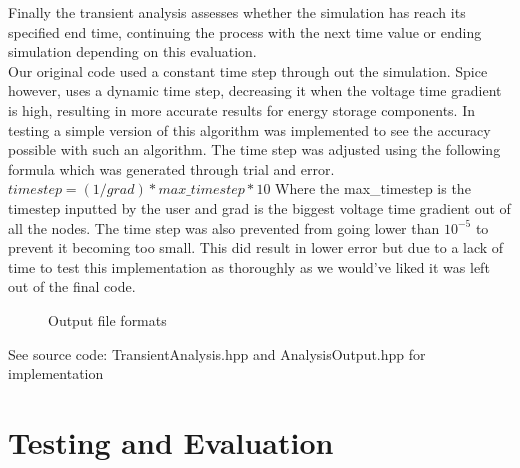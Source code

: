 \documentclass{article}
\begin{document}
Finally the transient analysis assesses whether the simulation has reach its specified end time, continuing the process with the next time value or ending simulation depending on this evaluation.\\ 
Our original code used a constant time step through out the simulation. Spice however, uses a dynamic time step, decreasing it when the voltage time gradient is high, resulting in more accurate results for energy storage components. In testing a simple version of this algorithm was implemented to see the accuracy possible with such an algorithm. The time step was adjusted using the following formula which was generated through trial and error. \bigbreak
$timestep = (1/grad) * max\_timestep * 10$\bigbreak
Where the max\_timestep is the timestep inputted by the user and grad is the biggest voltage time gradient out of all the nodes. The time step was also prevented from going lower than $10^{-5}$ to prevent it becoming too small. This did result in lower error but due to a lack of time to test this implementation as thoroughly as we would've liked it was left out of the final code. 

\begin{figure}[h]%
    \centering
    \qquad
    \caption{Output file formats}%
    \label{fig:CalculateCurrent}%
\end{figure}



\bigbreak
See source code: TransientAnalysis.hpp and AnalysisOutput.hpp for implementation


\newpage
\section{Testing and Evaluation}
\end{document}
